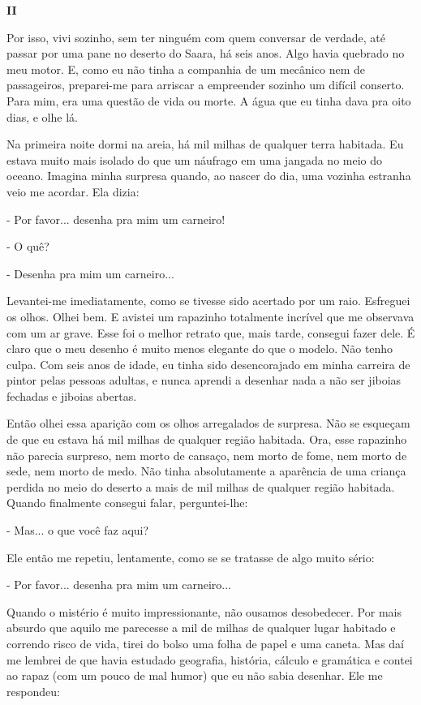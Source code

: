 \begin{Parallel}[p]{}{}
{\textbf{II}

Por isso, vivi sozinho, sem ter ninguém com quem conversar de verdade,
até passar por uma pane no deserto do Saara, há seis anos. Algo havia
quebrado no meu motor. E, como eu não tinha a companhia de um mecânico
nem de passageiros, preparei-me para arriscar a empreender sozinho um
difícil conserto. Para mim, era uma questão de vida ou morte. A água que
eu tinha dava pra oito dias, e olhe lá.

Na primeira noite dormi na areia, há mil milhas de qualquer terra
habitada. Eu estava muito mais isolado do que um náufrago em uma jangada
no meio do oceano. Imagina minha surpresa quando, ao nascer do dia, uma
vozinha estranha veio me acordar. Ela dizia:

- Por favor... desenha pra mim um carneiro!

- O quê?

- Desenha pra mim um carneiro...

Levantei-me imediatamente, como se tivesse sido acertado por um raio.
Esfreguei os olhos. Olhei bem. E avistei um rapazinho totalmente
incrível que me observava com um ar grave. Esse foi o melhor retrato
que, mais tarde, consegui fazer dele. É claro que o meu desenho é muito
menos elegante do que o modelo. Não tenho culpa. Com seis anos de idade,
eu tinha sido desencorajado em minha carreira de pintor pelas pessoas
adultas, e nunca aprendi a desenhar nada a não ser jiboias fechadas e
jiboias abertas.

Então olhei essa aparição com os olhos arregalados de surpresa. Não se
esqueçam de que eu estava há mil milhas de qualquer região habitada.
Ora, esse rapazinho não parecia surpreso, nem morto de cansaço, nem
morto de fome, nem morto de sede, nem morto de medo. Não tinha
absolutamente a aparência de uma criança perdida no meio do deserto a
mais de mil milhas de qualquer região habitada. Quando finalmente
consegui falar, perguntei-lhe:

- Mas... o que você faz aqui?

Ele então me repetiu, lentamente, como se se tratasse de algo muito
sério:

- Por favor... desenha pra mim um carneiro...

Quando o mistério é muito impressionante, não ousamos desobedecer. Por
mais absurdo que aquilo me parecesse a mil de milhas de qualquer lugar
habitado e correndo risco de vida, tirei do bolso uma folha de papel e
uma caneta. Mas daí me lembrei de que havia estudado geografia,
história, cálculo e gramática e contei ao rapaz (com um pouco de mal
humor) que eu não sabia desenhar. Ele me respondeu:

}
\end{Parallel}
